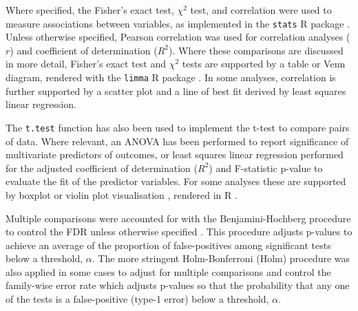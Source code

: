 Where specified, the Fisher's exact test, $\chi^2$ test, and correlation were used to measure associations between variables, as implemented in the \texttt{stats} R package \citep{R_core}. Unless otherwise specified, Pearson correlation was used for correlation analyses ($r$) and coefficient of determination ($R^2$). Where these comparisons are discussed in more detail, Fisher's exact test and $\chi^2$ tests are supported by a table or Venn diagram, rendered with the \texttt{limma} R package \citep{limma}. In some analyses, correlation is further supported by a scatter plot and a line of best fit derived by least squares linear regression. 

The \texttt{t.test} function \citep{R_core} has also been used to implement the t-test to compare pairs of data. Where relevant, an \acrfull{ANOVA} has been performed to report significance of multivariate predictors of outcomes, or least squares linear regression performed for the adjusted coefficient of determination ($R^2$) and F-statistic p-value to evaluate the fit of the predictor variables. For some analyses these are supported by boxplot or violin plot visualisation \citep{vioplot}, rendered in R \citep{R_core}.

Multiple comparisons were accounted for with the Benjamini-Hochberg procedure to control the \gls{FDR} unless otherwise specified \citep{fdr1995}. This procedure adjusts p-values to achieve an average of the proportion of false-positives among significant tests below a threshold, $\alpha$. The more stringent Holm-Bonferroni (Holm) procedure \citep{Holm1979} was also applied in some cases to adjust for multiple comparisons and control the family-wise error rate which adjusts p-values so that the probability that any one of the tests is a false-positive (type-1 error) below a threshold, $\alpha$.

